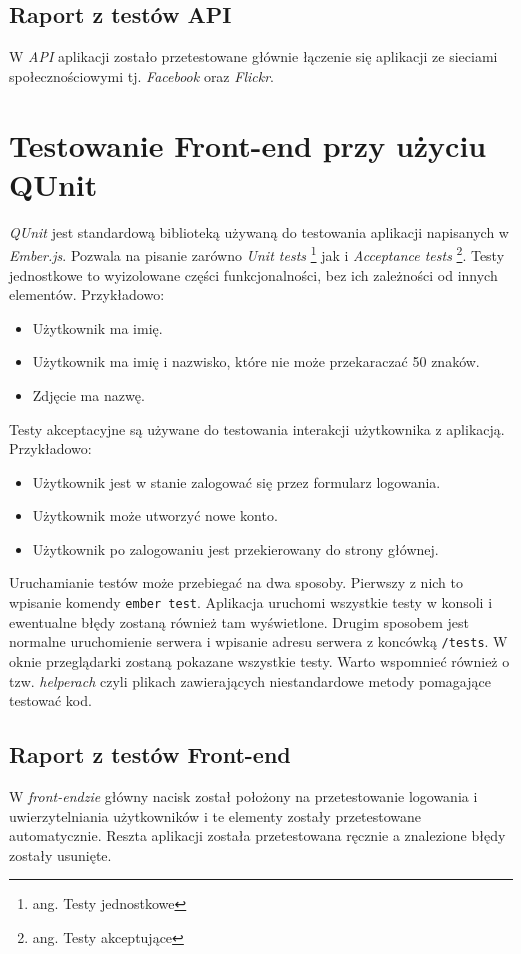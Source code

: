 \documentclass[brudnopis]{xmgr}
\begin{document}
\subsection{Raport z testów API}
W \textit{API} aplikacji zostało przetestowane głównie łączenie się aplikacji ze sieciami społecznościowymi tj. \textit{Facebook} oraz \textit{Flickr}. 
\section{Testowanie Front-end przy użyciu QUnit}
\textit{QUnit} jest standardową biblioteką używaną do testowania aplikacji napisanych w \textit{Ember.js}. Pozwala na pisanie zarówno \textit{Unit tests} \footnote{ang. Testy jednostkowe} jak i \textit{Acceptance tests} \footnote{ang. Testy akceptujące}.  Testy jednostkowe to wyizolowane części funkcjonalności, bez ich zależności od innych elementów. Przykładowo:
\begin{itemize}
\item Użytkownik ma imię.
\item Użytkownik ma imię i nazwisko, które nie może przekaraczać 50 znaków.
\item Zdjęcie ma nazwę.
\end{itemize}
Testy akceptacyjne są używane do testowania interakcji użytkownika z aplikacją. Przykładowo:
\begin{itemize}
\item Użytkownik jest w stanie zalogować się przez formularz logowania.
\item Użytkownik może utworzyć nowe konto.
\item Użytkownik po zalogowaniu jest przekierowany do strony głównej.
\end{itemize}
Uruchamianie testów może przebiegać na dwa sposoby. Pierwszy z nich to wpisanie komendy \verb|ember test|. Aplikacja uruchomi wszystkie testy w konsoli i ewentualne błędy zostaną również tam wyświetlone. Drugim sposobem jest normalne uruchomienie serwera i wpisanie adresu serwera z koncówką \verb|/tests|. W oknie przeglądarki zostaną pokazane wszystkie testy.
\newline \indent Warto wspomnieć również o tzw. \textit{helperach} czyli plikach zawierających niestandardowe metody pomagające testować kod.
\subsection{Raport z testów Front-end}
W \textit{front-endzie} główny nacisk został położony na przetestowanie logowania i uwierzytelniania użytkowników i te elementy zostały przetestowane automatycznie. Reszta aplikacji została przetestowana ręcznie a znalezione błędy zostały usunięte.
\end{document}

